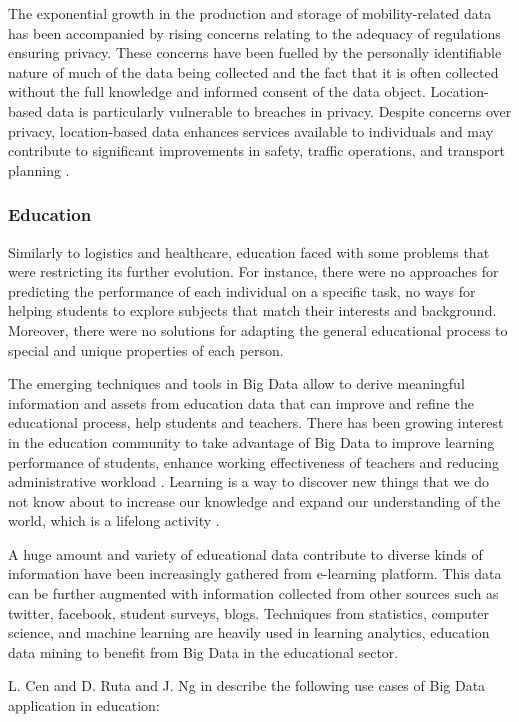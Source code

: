 \documentclass[runningheads]{llncs}
\begin{document}
The exponential growth in the production and storage of mobility-related data has been accompanied by rising concerns relating to the adequacy of regulations ensuring privacy. These concerns have been fuelled by the personally identifiable nature of much of the data being collected and the fact that it is often collected without the full knowledge and informed consent of the data object. Location-based data is particularly vulnerable to breaches in privacy. Despite concerns over privacy, location-based data enhances services available to individuals and may contribute to significant improvements in safety, traffic operations, and transport planning \cite{TRANSPORT}. 

\subsubsection{Education}

Similarly to logistics and healthcare, education faced with some problems that were restricting its further evolution. For instance, there were no approaches for predicting the performance of each individual on a specific task, no ways for helping students to explore subjects that match their interests and background. Moreover, there were no solutions for adapting the general educational process to special and unique properties of each person. 

The emerging techniques and tools in Big Data allow to derive meaningful information and assets from education data that can improve and refine the educational process, help students and teachers. There has been growing interest in the education community to take advantage of Big Data to improve learning performance of
students, enhance working effectiveness of teachers and reducing administrative workload \cite{SHAMRZO}. Learning is a way to discover new things that we do not know about to increase our knowledge and expand our understanding of the world, which is a lifelong activity \cite{BIGEDUCATION}. 

A huge amount and variety of educational data contribute to diverse kinds of information have been increasingly gathered from e-learning platform. This data can be further augmented with information collected from other sources such as twitter, facebook, student surveys, blogs. Techniques from statistics, computer science, and machine learning are heavily used in learning analytics, education data mining to benefit from Big Data in the educational sector.

L. Cen and D. Ruta and J. Ng in \cite{EDUCATIONOPPORTUNITIES} describe the following use cases of Big Data application in education:
\end{document}
